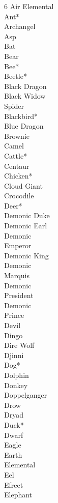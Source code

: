 \begin{multicols}{6}\small
Air Elemental \\
Ant* \\
Archangel \\
Asp \\
Bat \\
Bear \\
Bee* \\
Beetle* \\
Black Dragon \\
Black Widow \\
Spider \\
Blackbird* \\
Blue Dragon \\
Brownie \\
Camel \\
Cattle* \\
Centaur \\
Chicken* \\
Cloud Giant \\
Crocodile \\
Deer* \\
Demonic Duke \\
Demonic Earl \\
Demonic \\
Emperor \\
Demonic King \\
Demonic \\
Marquis \\
Demonic \\
President \\
Demonic \\
Prince \\
Devil \\
Dingo \\
Dire Wolf \\
Djinni \\
Dog* \\
Dolphin \\
Donkey \\
Doppelganger \\
Drow \\
Dryad \\
Duck* \\
Dwarf \\
Eagle \\
Earth \\
Elemental \\
Eel \\
Efreet \\
Elephant \\

\end{multicols}
